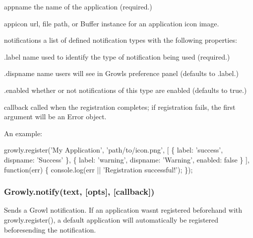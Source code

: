\begin{DoxyItemize}
\item {\ttfamily appname} the name of the application (required.)
\item {\ttfamily appicon} url, file path, or Buffer instance for an application icon image.
\item {\ttfamily notifications} a list of defined notification types with the following properties\+:
\begin{DoxyItemize}
\item {\ttfamily .label} name used to identify the type of notification being used (required.)
\item {\ttfamily .dispname} name users will see in Growl\textquotesingle{}s preference panel (defaults to {\ttfamily .label}.)
\item {\ttfamily .enabled} whether or not notifications of this type are enabled (defaults to true.)
\end{DoxyItemize}
\item {\ttfamily callback} called when the registration completes; if registration fails, the first argument will be an Error object.
\end{DoxyItemize}

An example\+:


\begin{DoxyCode}
growly.register('My Application', 'path/to/icon.png', [
    \{ label: 'success', dispname: 'Success' \},
    \{ label: 'warning', dispname: 'Warning', enabled: false \}
], function(err) \{
    console.log(err || 'Registration successful!');
\});
\end{DoxyCode}


\subsubsection*{Growly.\+notify(text, \mbox{[}opts\mbox{]}, \mbox{[}callback\mbox{]})}

Sends a Growl notification. If an application wasn\textquotesingle{}t registered beforehand with {\ttfamily growly.\+register()}, a default application will automatically be registered beforesending the notification.


